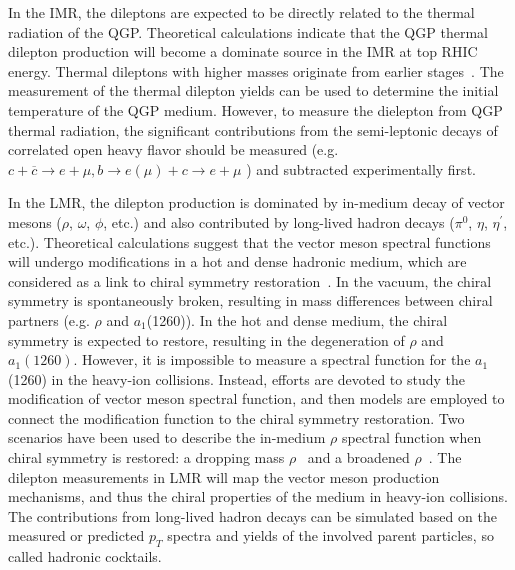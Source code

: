In the IMR, the dileptons are expected to be directly related to the thermal radiation of the QGP. Theoretical calculations indicate that the QGP thermal dilepton production will become a dominate source in the IMR at top RHIC energy. Thermal dileptons with higher masses originate from earlier stages~\cite{broaden1}. The measurement of the thermal dilepton yields can be used to determine the initial temperature of the QGP medium. However, to measure the dielepton from QGP thermal radiation, the significant contributions from the semi-leptonic decays of correlated open heavy flavor should be measured (e.g.  $c + \overline{c} \rightarrow e + \mu, b \rightarrow e(\mu) + c \rightarrow e + \mu$ ) and subtracted experimentally first.
 
 In the LMR, the dilepton production is dominated by in-medium decay of vector mesons ($\rho$, $\omega$, $\phi$, etc.) and also contributed by long-lived hadron decays ($\pi^{0}$, $\eta$, $\eta^{\prime}$, etc.). Theoretical calculations suggest that the vector meson spectral functions will undergo modifications in a hot and dense hadronic medium, which are considered as a link to chiral symmetry restoration~\cite{broaden0,broaden1,broaden2}. In the vacuum, the chiral symmetry is spontaneously broken, resulting in mass differences between chiral partners (e.g. $\rho$ and $a_{1}$(1260)). In the hot and dense medium, the chiral symmetry is expected to restore, resulting in the degeneration of $\rho$ and $a_{1}(1260)$. However, it is impossible to measure a spectral function for the $a_{1}$(1260) in the heavy-ion collisions. Instead, efforts are devoted to study the modification of vector meson spectral function, and then models are employed to connect the modification function to the chiral symmetry restoration. Two scenarios have been used to describe the in-medium $\rho$ spectral function when chiral symmetry is restored: a dropping mass $\rho$~\cite{dropmass} and a broadened $\rho$~\cite{broaden2}. The dilepton measurements in LMR will map the vector meson production mechanisms, and thus the chiral properties of the medium in heavy-ion collisions. The contributions from long-lived hadron decays can be simulated based on the measured or predicted $p_{T}$ spectra and yields of the involved parent particles, so called hadronic cocktails.

